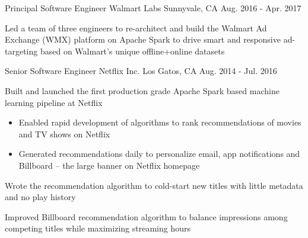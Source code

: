 \begin{cventries}
  \cventry
    {Principal Software Engineer} %
    {Walmart Labs} %
    {Sunnyvale, CA} %
    {Aug. 2016 - Apr. 2017} %
    {
      \begin{cvitems} %
        \item{Led a team of three engineers to re-architect and build the Walmart Ad Exchange (WMX) platform on Apache Spark to drive smart and responsive ad-targeting based on Walmart’s unique offline+online datasets}
      \end{cvitems}
    }

  \cventry
    {Senior Software Engineer} %
    {Netflix Inc.} %
    {Los Gatos, CA} %
    {Aug. 2014 - Jul. 2016} %
    {
      \begin{cvitems} %
        \item{Built and launched the first production grade Apache Spark based machine learning pipeline at Netflix}
          \begin{itemize}[label=$\circ$]
            \item{Enabled rapid development of algorithms to rank recommendations of movies and TV shows on Netflix}
            \item{Generated recommendations daily to personalize email, app notifications and Billboard – the large banner on Netflix homepage}
          \end{itemize}
        \item{Wrote the recommendation algorithm to cold-start new titles with little metadata and no play history}
        \item{Improved Billboard recommendation algorithm to balance impressions among competing titles while maximizing streaming hours}
      \end{cvitems}
    }


\end{cventries}
